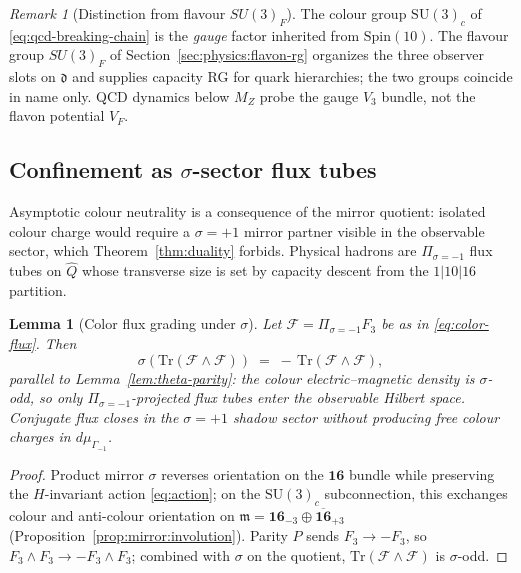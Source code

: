 \documentclass[11pt]{article}
\theoremstyle{plain}
\newtheorem{lemma}[theorem]{Lemma}
\theoremstyle{definition}
\theoremstyle{remark}
\newtheorem{remark}[theorem]{Remark}
\numberwithin{equation}{section}
\newcommand{\Spin}{\mathrm{Spin}}
\begin{document}
\begin{remark}[Distinction from flavour $SU(3)_F$]
The colour group $\mathrm{SU}(3)_c$ of \eqref{eq:qcd-breaking-chain} is the
\emph{gauge} factor inherited from $\Spin(10)$. The flavour group
$SU(3)_F$ of Section~\ref{sec:physics:flavon-rg} organizes the three observer
slots on $\mathfrak{d}$ and supplies capacity RG for quark hierarchies; the
two groups coincide in name only. QCD dynamics below $M_Z$ probe the gauge
$V_3$ bundle, not the flavon potential $V_F$.
\end{remark}

\subsection{Confinement as $\sigma$-sector flux tubes}
\label{sec:qcd:confinement}

Asymptotic colour neutrality is a consequence of the mirror quotient: isolated
colour charge would require a $\sigma=+1$ mirror partner visible in the
observable sector, which Theorem~\ref{thm:duality} forbids. Physical
hadrons are $\Pi_{\sigma=-1}$ flux tubes on $\hat Q$ whose transverse size
is set by capacity descent from the $1|10|16$ partition.

\begin{lemma}[Color flux grading under $\sigma$]
\label{lem:color-flux-sigma}
Let $\mathcal{F}=\Pi_{\sigma=-1}F_3$ be as in \eqref{eq:color-flux}. Then
\begin{equation}\label{eq:flux-sigma-odd}
  \sigma(\mathrm{Tr}(\mathcal{F}\wedge\mathcal{F}))
  \;=\;
  -\,\mathrm{Tr}(\mathcal{F}\wedge\mathcal{F}),
\end{equation}
parallel to Lemma~\ref{lem:theta-parity}: the colour electric--magnetic
density is $\sigma$-odd, so only $\Pi_{\sigma=-1}$-projected flux tubes
enter the observable Hilbert space. Conjugate flux closes in the
$\sigma=+1$ shadow sector without producing free colour charges in
$d\mu_{\Gamma_{-1}}$.
\end{lemma}

\begin{proof}
Product mirror $\sigma$ reverses orientation on the $\mathbf{16}$
bundle while preserving the $H$-invariant action \eqref{eq:action}; on the
$\mathrm{SU}(3)_c$ subconnection, this exchanges colour and anti-colour
orientation on $\mathfrak{m}=\mathbf{16}_{-3}\oplus\overline{\mathbf{16}}_{+3}$
(Proposition~\ref{prop:mirror:involution}). Parity $P$ sends
$F_3\to -F_3$, so $F_3\wedge F_3\to -F_3\wedge F_3$; combined with
$\sigma$ on the quotient, $\mathrm{Tr}(\mathcal{F}\wedge\mathcal{F})$ is
$\sigma$-odd.
\end{proof}
\end{document}
